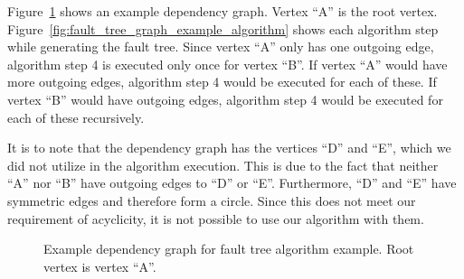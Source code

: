 

Figure~\ref{fig:fault_tree_graph_example} shows an example dependency graph. Vertex ``A'' is the root vertex. Figure~\ref{fig:fault_tree_graph_example_algorithm} shows each algorithm step while generating the fault tree. Since vertex ``A'' only has one outgoing edge, algorithm step 4 is executed only once for vertex ``B''. If vertex ``A'' would have more outgoing edges, algorithm step 4 would be executed for each of these. If vertex ``B'' would have outgoing edges, algorithm step 4 would be executed for each of these recursively.

It is to note that the dependency graph has the vertices ``D'' and ``E'', which we did not utilize in the algorithm execution. This is due to the fact that neither ``A'' nor ``B'' have outgoing edges to ``D'' or ``E''. Furthermore, ``D'' and ``E'' have symmetric edges and therefore form a circle. Since this does not meet our requirement of acyclicity, it is not possible to use our algorithm with them.

\begin{figure}[h]
  \centering
  \caption{Example dependency graph for fault tree algorithm example. Root vertex is vertex ``A''.}
  \label{fig:fault_tree_graph_example}
\end{figure}

